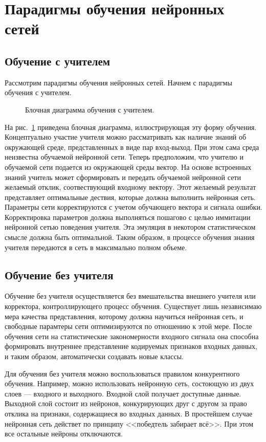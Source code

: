 \section{Парадигмы обучения нейронных сетей}

\subsection{Обучение с учителем}

Рассмотрим парадигмы обучения нейронных сетей.
Начнем с парадигмы обучения с учителем.

\begin{figure}[h]
\caption{Блочная диаграмма обучения с учителем.}
\label{ris:WithTeacher}
\end{figure}

На рис.~\ref{ris:WithTeacher} приведена блочная диаграмма, иллюстрирующая эту форму обучения. 
Концептуально участие учителя можно рассматривать как наличие знаний об окружающей среде, представленных в виде пар вход-выход.
При этом сама среда неизвестна обучаемой нейронной сети.
Теперь предположим, что учителю и обучаемой сети подается  из окружающей среды вектор.
На основе встроенных знаний учитель может сформировать и передать обучаемой нейронной сети желаемый отклик, соотвествующий входному вектору.
Этот желаемый результат представляет оптимальные дествия, которые должна выполнить нейронная сеть.
Параметры сети корректируются с учетом обучающего вектора и сигнала ошибки.
Корректировка параметров должна выполняться пошагово с целью иммитации нейронной сетью поведения учителя.
Эта эмуляция в некотором статистическом смысле должна быть оптимальной.
Таким образом, в процессе обучения знания учителя передаются в сеть в максимально полном объеме.
 

\subsection{Обучение без учителя}

Обучение без учителя осуществляется без вмешательства внешнего учителя или корректора, контроллирующего процесс обучения.
Существует лишь независимаю мера качества представления, которому должна научиться нейронная сеть, и свободные парамтеры сети оптимизируются по отношению к этой мере.
После обучения сети на статистические закономерности входного сигнала она способна формировать внутреннее представление кодируемых признаков входных данных, и таким образом, автоматически создавать новые классы.

Для обучения без учителя можно воспользоваться правилом конкурентного обучения.
Например, можно использовать нейронную сеть, состоющую из двух слоев --- входного и выходного.
Входной слой получает доступные данные.
Выходной слой состоит из нейронов, конкурирующих друг с другом за право отклика на признаки, содержащиеся во входных данных.
В простейшем случае нейронная сеть действет по принципу <<победтель забирает всё>>.
При этом все остальные нейроны отключаются.